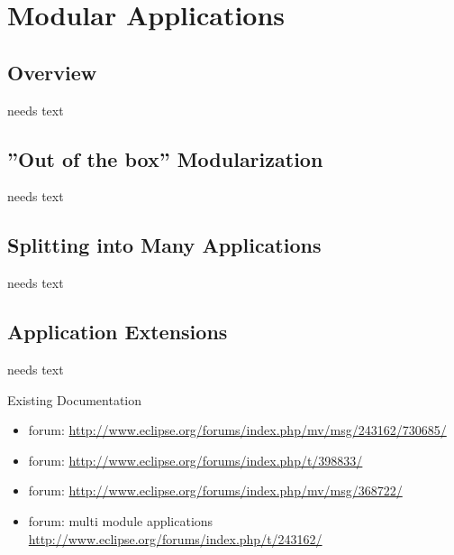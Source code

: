 \documentclass[a4paper,10pt,twoside]{book}
\begin{document}
  \sloppy
\fi


\chapter{Modular Applications}

\section{Overview}
needs text

\section{''Out of the box'' Modularization}
needs text

\section{Splitting into Many Applications}
needs text

\section{Application Extensions}
needs text

\noindent Existing Documentation
\begin{itemize}
  \item forum: \url{http://www.eclipse.org/forums/index.php/mv/msg/243162/730685/}
  \item forum: \url{http://www.eclipse.org/forums/index.php/t/398833/}
  \item forum: \url{http://www.eclipse.org/forums/index.php/mv/msg/368722/}
  \item forum: multi module applications \url{http://www.eclipse.org/forums/index.php/t/243162/}
\end{itemize}


\ifx\wholebook\relax\else
   
   
\end{document}
